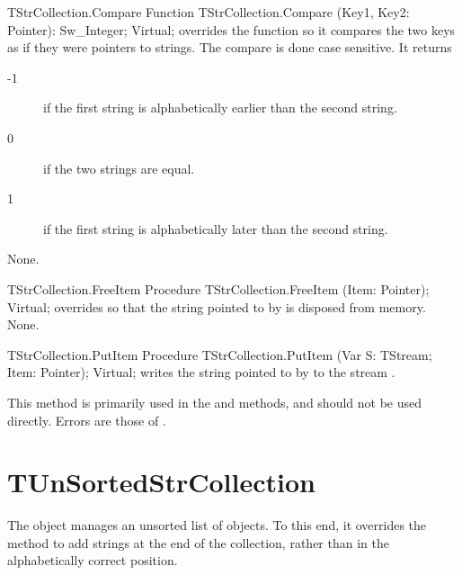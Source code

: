 \begin{function}{TStrCollection.Compare}
\Declaration
Function TStrCollection.Compare (Key1, Key2: Pointer): Sw\_Integer; Virtual;
\Description
{} overrides the  function so it compares 
the two keys as if they were pointers to strings. The compare is done case
sensitive. It returns
\begin{description}
\item[-1] if the first string is alphabetically earlier  than the second
string.
\item[0] if the two strings are equal.
\item[1] if the first string is alphabetically later than the second string.
\end{description}
\Errors
None.
\SeeAlso
{}
\end{function}


\html{}


\begin{procedure}{TStrCollection.FreeItem}
\Declaration
Procedure TStrCollection.FreeItem (Item: Pointer); Virtual;
\Description
{} overrides  so that the string pointed
to by  is disposed from memory.
\Errors
None.
\SeeAlso
{}
\end{procedure}

\begin{procedure}{TStrCollection.PutItem}
\Declaration
Procedure TStrCollection.PutItem (Var S: TStream; Item: Pointer); Virtual;
\Description
{} writes the string pointed to by  to the stream
. 

This method is primarily used in the  and  methods, 
and should not be used directly.
\Errors
Errors are those of .
\SeeAlso
{}
\end{procedure}

\section{TUnSortedStrCollection}
\label{se:TUnSortedStrCollection}

The  object manages an unsorted list of objects.
To this end, it overrides the  method to add
strings at the end of the collection, rather than in the alphabetically
correct position.

